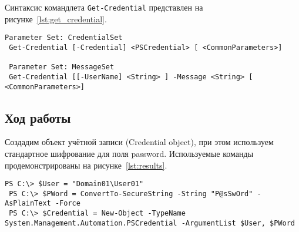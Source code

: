 Синтаксис командлета \texttt{Get-Credential} представлен на
рисунке~\ref{lst:get_credential}.
\begin{lstlisting}[caption={Синтаксис командлета \texttt{Get-Credential}},
label=lst:get_credential,basicstyle=\scriptsize\ttfamily]
 Parameter Set: CredentialSet
 Get-Credential [-Credential] <PSCredential> [ <CommonParameters>]

 Parameter Set: MessageSet
 Get-Credential [[-UserName] <String> ] -Message <String> [ <CommonParameters>]
\end{lstlisting}

\subsection{Ход работы}

Создадим объект учётной записи (Credential object), при этом используем
стандартное шифрование для поля password. Используемые команды
продемонстрированы на рисунке~\ref{lst:results}.
\begin{lstlisting}[caption={Пример совместного использования командлетов \texttt{Get-Credential}
 и \texttt{ConvertTo-SecureString}},
label=lst:results]
 PS C:\> $User = "Domain01\User01"
 PS C:\> $PWord = ConvertTo-SecureString -String "P@sSwOrd" -AsPlainText -Force
 PS C:\> $Credential = New-Object -TypeName System.Management.Automation.PSCredential -ArgumentList $User, $PWord
\end{lstlisting}

